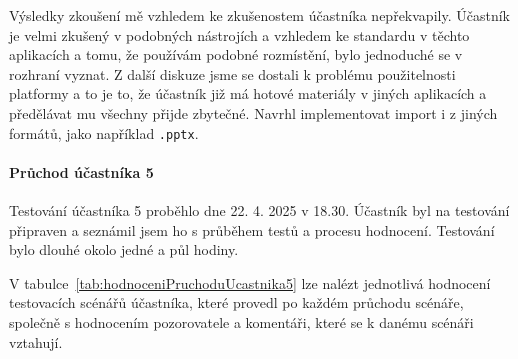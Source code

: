 Výsledky zkoušení mě vzhledem ke zkušenostem účastníka nepřekvapily.
Účastník je velmi zkušený v podobných nástrojích a vzhledem ke standardu v těchto aplikacích a tomu, že používám podobné rozmístění, bylo jednoduché se v rozhraní vyznat.
Z další diskuze jsme se dostali k problému použitelnosti platformy a to je to, že účastník již má hotové materiály v jiných aplikacích a předělávat mu všechny přijde zbytečné.
Navrhl implementovat import i z jiných formátů, jako například \verb|.pptx|.

\paragraph{Průchod účastníka 5}

Testování účastníka 5 proběhlo dne 22. 4. 2025 v 18.30. 
Účastník byl na testování připraven a seznámil jsem ho s průběhem testů a procesu hodnocení. 
Testování bylo dlouhé okolo jedné a půl hodiny.

V tabulce~\ref{tab:hodnoceniPruchoduUcastnika5} lze nalézt jednotlivá hodnocení testovacích scénářů účastníka, které provedl po každém průchodu scénáře, společně s hodnocením pozorovatele a komentáři, které se k danému scénáři vztahují.

